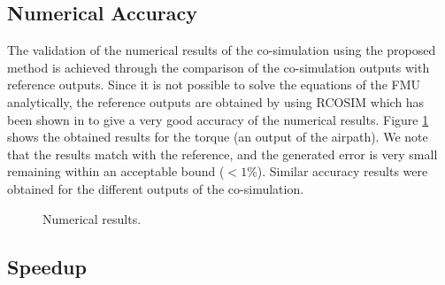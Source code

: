 \subsection{Numerical Accuracy}

The validation of the numerical results of the co-simulation using the proposed method is achieved through the comparison of the co-simulation outputs with reference outputs. Since it is not possible to solve the equations of the FMU analytically, the reference outputs are obtained by using RCOSIM which has been shown in \cite{benkhaled:2014} to give a very good accuracy of the numerical results. Figure \ref{fig:df} shows the obtained results for the torque (an output of the airpath). We note that the results match with the reference, and the generated error is very small remaining within an acceptable bound ($< 1\%$). Similar accuracy results were obtained for the different outputs of the co-simulation.

\begin{figure}[phbt]
\centering

\caption{Numerical results.}
\label{fig:df}
\end{figure}

\subsection{Speedup}


